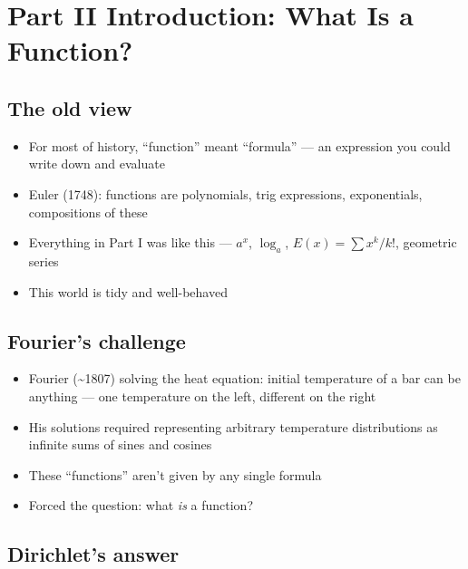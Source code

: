 \documentclass[
  10pt,
  letterpaper,
]{scrbook}
\providecommand{\tightlist}{%
  \setlength{\itemsep}{0pt}\setlength{\parskip}{0pt}}
\begin{document}
\section*{Part II Introduction: What Is a
Function?}\label{part-ii-introduction-what-is-a-function}


\subsection*{The old view}\label{the-old-view}

\begin{itemize}
\tightlist
\item
  For most of history, ``function'' meant ``formula'' --- an expression
  you could write down and evaluate
\item
  Euler (1748): functions are polynomials, trig expressions,
  exponentials, compositions of these
\item
  Everything in Part I was like this --- \(a^x\), \(\log_a\),
  \(E(x) = \sum x^k/k!\), geometric series
\item
  This world is tidy and well-behaved
\end{itemize}

\subsection*{Fourier's challenge}\label{fouriers-challenge}

\begin{itemize}
\tightlist
\item
  Fourier (\textasciitilde1807) solving the heat equation: initial
  temperature of a bar can be anything --- one temperature on the left,
  different on the right
\item
  His solutions required representing arbitrary temperature
  distributions as infinite sums of sines and cosines
\item
  These ``functions'' aren't given by any single formula
\item
  Forced the question: what \emph{is} a function?
\end{itemize}

\subsection*{Dirichlet's answer}\label{dirichlets-answer}
\end{document}
